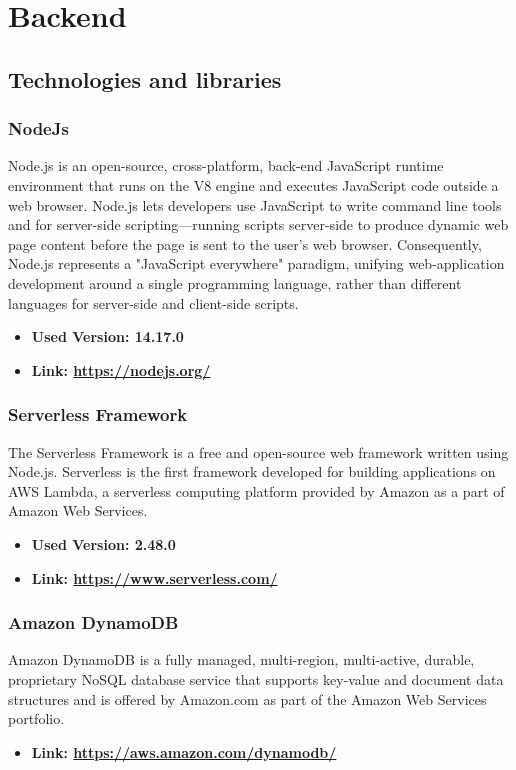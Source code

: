 \section{Backend}
\subsection{Technologies and libraries}
\subsubsection{NodeJs}
Node.js is an open-source, cross-platform, back-end JavaScript runtime environment that runs on the
V8 engine and executes JavaScript code outside a web browser. Node.js lets developers use JavaScript
to write command line tools and for server-side scripting—running scripts server-side to produce
dynamic web page content before the page is sent to the user’s web browser. Consequently, Node.js
represents a "JavaScript everywhere" paradigm, unifying web-application development around a single
programming language, rather than different languages for server-side and client-side scripts.
\begin{itemize}
    \item \textbf{Used Version: 14.17.0}
    \item \textbf{Link: \url{https://nodejs.org/}}
\end{itemize}
\subsubsection{Serverless Framework}
The Serverless Framework is a free and open-source web framework written using Node.js. Serverless is the first
framework developed for building applications on AWS Lambda, a serverless computing platform provided
by Amazon as a part of Amazon Web Services.
\begin{itemize}
    \item \textbf{Used Version: 2.48.0}
    \item \textbf{Link: \url{https://www.serverless.com/}}
\end{itemize}
\subsubsection{Amazon DynamoDB}
Amazon DynamoDB is a fully managed, multi-region, multi-active, durable, proprietary NoSQL database service that supports key-value
and document data structures and is offered by Amazon.com as part of the Amazon Web Services
portfolio.
\begin{itemize}
    \item \textbf{Link: \url{https://aws.amazon.com/dynamodb/}}
\end{itemize}
